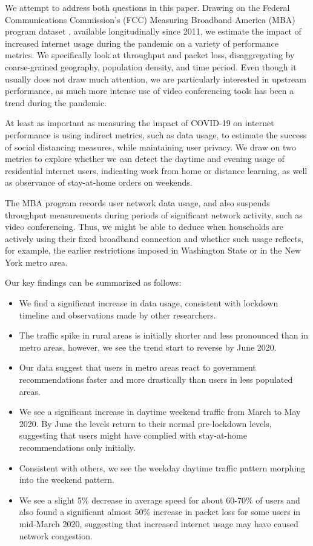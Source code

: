 \documentclass[conference,10pt]{IEEEtran}
\begin{document}
We attempt to address both questions in this paper. Drawing on the Federal Communications Commission's (FCC) Measuring Broadband America (MBA) program dataset \cite{mba}, available longitudinally since 2011, we estimate the impact of increased internet usage during the pandemic on a variety of performance metrics. We specifically look at throughput and packet loss, disaggregating by coarse-grained geography, population density, and time period. Even though it usually does not draw much attention, we are particularly interested in upstream performance, as much more intense use of video conferencing tools has been a trend during the pandemic.

At least as important as measuring the impact of COVID-19 on internet performance is using indirect metrics, such as data usage, to estimate the success of social distancing measures, while maintaining user privacy. We draw on two metrics to explore whether we can detect the daytime and evening usage of residential internet users, indicating work from home or distance learning, as well as observance of stay-at-home orders on weekends. 

The MBA program records user network data usage, and also suspends throughput measurements during periods of significant network activity, such as video conferencing. Thus, we might be able to deduce when households are actively using their fixed broadband connection and whether such usage reflects, for example, the earlier restrictions imposed in Washington State or in the New York metro area.

Our key findings can be summarized as follows:
\begin{itemize}
    \item We find a significant increase in data usage, consistent with lockdown timeline and observations made by other researchers.
    \item The traffic spike in rural areas is initially shorter and less pronounced than in metro areas, however, we see the trend start to reverse by June 2020.
    \item Our data suggest that users in metro areas react to government recommendations faster and more drastically than users in less populated areas.
    \item We see a significant increase in daytime weekend traffic from March to May 2020. By June the levels return to their normal pre-lockdown levels, suggesting that users might have complied with stay-at-home recommendations only initially.
    \item Consistent with others, we see the weekday daytime traffic pattern morphing into the weekend pattern.
    \item We see a slight 5\% decrease in average speed for about 60-70\% of users and also found a significant almost 50\% increase in packet loss for some users in mid-March 2020, suggesting that increased internet usage may have caused network congestion.
\end{itemize}
\end{document}
